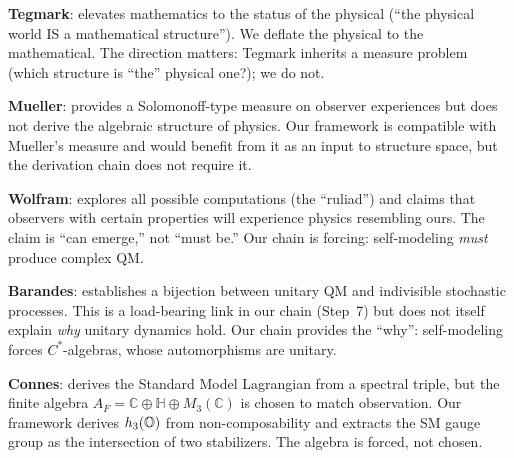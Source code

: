\textbf{Tegmark}: elevates mathematics to the status of the physical
(``the physical world IS a mathematical structure'').  We deflate the
physical to the mathematical.  The direction matters: Tegmark inherits
a measure problem (which structure is ``the'' physical one?); we do
not.

\textbf{Mueller}: provides a Solomonoff-type measure on observer
experiences but does not derive the algebraic structure of physics.
Our framework is compatible with Mueller's measure and would benefit
from it as an input to structure space, but the derivation chain does
not require it.

\textbf{Wolfram}: explores all possible computations (the ``ruliad'')
and claims that observers with certain properties will experience
physics resembling ours.  The claim is ``can emerge,'' not ``must
be.''  Our chain is forcing: self-modeling \emph{must} produce complex
QM.

\textbf{Barandes}: establishes a bijection between unitary QM and
indivisible stochastic processes.  This is a load-bearing link in our
chain (Step~7) but does not itself explain \emph{why} unitary dynamics
hold.  Our chain provides the ``why'': self-modeling forces
$C^*$-algebras, whose automorphisms are unitary.

\textbf{Connes}: derives the Standard Model Lagrangian from a spectral
triple, but the finite algebra $A_F = \mathbb{C} \oplus \mathbb{H}
\oplus M_3(\mathbb{C})$ is chosen to match observation.  Our framework
derives $h_3(\mathbb{O})$ from non-composability and extracts the SM gauge
group as the intersection of two stabilizers.  The algebra is forced,
not chosen.
